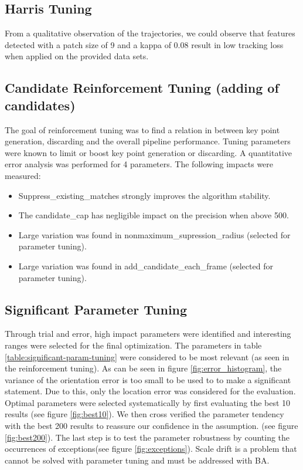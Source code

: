 \subsection{Harris Tuning}
From a qualitative observation of the trajectories, we could observe that features detected with a patch size of 9 and a kappa of 0.08 result in low tracking loss when applied on the provided data sets.

\subsection{Candidate Reinforcement Tuning (adding of candidates)} 
The goal of reinforcement tuning was to find a relation in between key point generation, discarding and the overall pipeline performance. Tuning parameters were known to limit or boost key point generation or discarding. A quantitative error analysis was performed for 4 parameters. The following impacts were measured:

\begin{itemize}
    \item Suppress\_existing\_matches strongly improves the algorithm stability.
    \item The candidate\_cap has negligible impact on the precision when above 500.
    \item Large variation was found in nonmaximum\_supression\_radius (selected for parameter tuning).
    \item Large variation was found in add\_candidate\_each\_frame (selected for parameter tuning).
\end{itemize}

\subsection{Significant Parameter Tuning}  
Through trial and error, high impact parameters were identified and interesting ranges were selected for the final optimization. 
The parameters in table \ref{table:significant-param-tuning} were considered to be most relevant (as seen in the reinforcement tuning). 
As can be seen in figure \ref{fig:error_histogram}, the variance of the orientation error is too small to be used to to make a significant statement.
Due to this, only the location error was considered for the evaluation.
Optimal parameters were selected systematically by first evaluating the best 10 results (see figure \ref{fig:best10}).
We then cross verified the parameter tendency with the best 200 results to reassure our confidence in the assumption. (see figure \ref{fig:best200}). The last step is to test the parameter robustness  by counting the occurrences of exceptions(see figure \ref{fig:exceptions}). 
Scale drift is a problem that cannot be solved with parameter tuning and must be addressed with BA.

